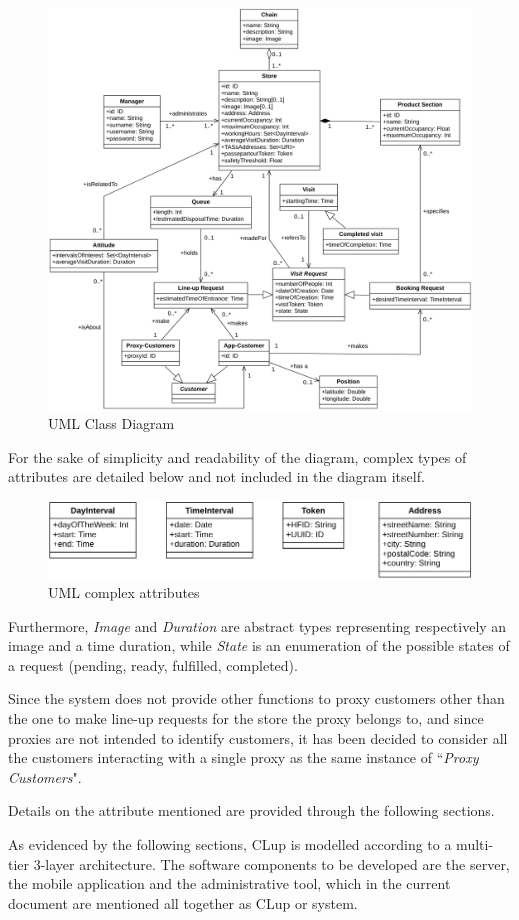 \documentclass[a4paper,oneside,11pt]{book}
\begin{document}
    \begin{figure}[H]
        \centering
        \includegraphics[width=\textwidth, height=\textheight, keepaspectratio]{pictures/uml_class_diagram}
        \caption{UML Class Diagram}
        \label{figure:uml}
    \end{figure}
    For the sake of simplicity and readability of the diagram, complex types of attributes are detailed below and not included in the diagram itself. 
    \begin{figure}[H]
        \centering
        \includegraphics[width=.8\textwidth, height=\textheight, keepaspectratio]{pictures/uml_complex_attributes}
        \caption{UML complex attributes}
        \label{figure:uml_complex_attributes}
    \end{figure}
    Furthermore, \textit{Image} and \textit{Duration} are abstract types representing respectively an image and a time duration, while \textit{State} is an enumeration of the possible states of a request (pending, ready, fulfilled, completed). \par
    Since the system does not provide other functions to proxy customers other than the one to make line-up requests for the store the proxy belongs to, and since proxies are not intended to identify customers, it has been decided to consider all the customers interacting with a single proxy as the same instance of ``\textit{Proxy Customers}". \par
    Details on the attribute mentioned are provided through the following sections. \par
    As evidenced by the following sections, CLup is modelled according to a multi-tier 3-layer architecture. The software components to be developed are the server, the mobile application and the administrative tool, which in the current document are mentioned all together as CLup or system.
    
\end{document}
